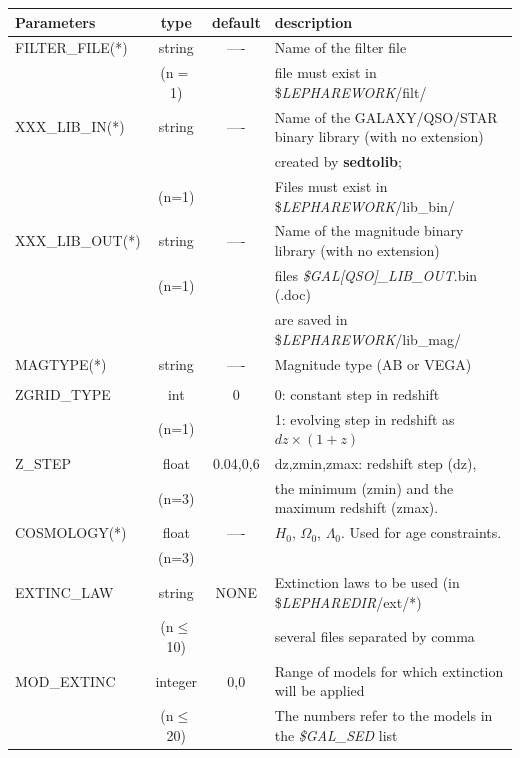 \documentclass[12pt]{article}
\begin{document}
\begin{tabular}{lccl}
 Parameters     & type    & default &  description \\
\hline
%
 FILTER\_FILE(*)  & string    & ---- & Name of the filter file   \\ 
                            & (n$=$1)  &      &  file must exist in   \${\it LEPHAREWORK}/filt/ \\
%
 XXX\_LIB\_IN(*) & string    & ---- & Name of the GALAXY/QSO/STAR  binary library (with no extension) \\ & & & created by {\bf sedtolib};\\
                           & (n=1)    &      &  Files must exist in  \${\it LEPHAREWORK}/lib\_bin/        \\    
%
 XXX\_LIB\_OUT(*) & string & ---- & Name of the magnitude  binary library (with no extension) \\
                              & (n=1) &       & files {\it \$GAL[QSO]\_LIB\_OUT}.bin (.doc)  \\
                              &          &       &  are saved in  \${\it LEPHAREWORK}/lib\_mag/       \\     
%
 MAGTYPE(*)   & string     & ---- & Magnitude type (AB or VEGA)      \\
       \\ 
%
 ZGRID\_TYPE    & int        & 0   & 0: constant step in redshift \\ 
                      & (n=1)   &  & 1: evolving step in redshift as $dz \times (1+z)$      \\
%
 Z\_STEP       & float    & 0.04,0,6   & dz,zmin,zmax: redshift step (dz), \\ 
                      & (n=3)   &       &     the minimum (zmin) and the maximum redshift (zmax).                    \\
%
 COSMOLOGY(*) & float &---- & $H_0$, $\Omega_0$, $\Lambda_0$. Used for age constraints.  \\
                             &(n=3)&      &      \\
%
EXTINC\_LAW &string&NONE &  Extinction laws to be used (in \${\it LEPHAREDIR}/ext/*) \\
                        & (n$\le$10)&   &  several files separated by comma              \\
%
 MOD\_EXTINC & integer & 0,0 & Range of models  for which extinction will be applied \\
                          & (n$\le$20) &       & The numbers refer to the models in the {\it \$GAL\_SED}  list \\

\end{tabular}
\end{document}
